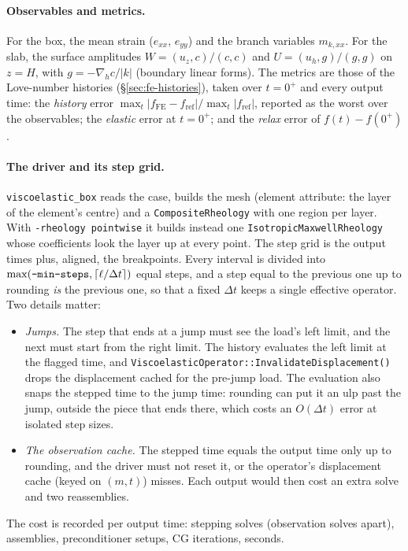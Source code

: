 \documentclass[11pt]{article}
\numberwithin{equation}{section}
\newcommand{\code}[1]{\texttt{#1}}
\begin{document}
\paragraph{Observables and metrics.}
For the box, the mean strain ($e_{xx}$, $e_{yy}$) and the branch variables
$m_{k,xx}$. For the slab, the surface amplitudes
$W=(u_z,c)/(c,c)$ and $U=(u_h,g)/(g,g)$ on $z=H$, with $g=-\nabla_hc/|k|$
(boundary linear forms). The metrics are those of the Love-number
histories (\S\ref{sec:fe-histories}), taken over $t=0^+$ and every output
time: the \emph{history} error
$\max_t|f_{\text{FE}}-f_{\text{ref}}|/\max_t|f_{\text{ref}}|$, reported as
the worst over the observables; the \emph{elastic} error at $t=0^+$; and
the \emph{relax} error of $f(t)-f(0^+)$.

\paragraph{The driver and its step grid.}
\code{viscoelastic\_box} reads the case, builds the mesh (element
attribute: the layer of the element's centre) and a
\code{CompositeRheology} with one region per layer. With
\code{-rheology pointwise} it builds instead one
\code{IsotropicMaxwellRheology} whose coefficients look the layer up at
every point. The step grid is the output times plus, aligned, the
breakpoints. Every interval is divided into
$\max(\text{\code{-min-steps}},\lceil\ell/\Delta t\rceil)$ equal steps, and
a step equal to the previous one up to rounding \emph{is} the previous
one, so that a fixed $\Delta t$ keeps a single effective operator. Two
details matter:
\begin{itemize}[leftmargin=*]
\item \emph{Jumps.} The step that ends at a jump must see the load's left
  limit, and the next must start from the right limit. The history
  evaluates the left limit at the flagged time, and
  \code{ViscoelasticOperator::InvalidateDisplacement()} drops the
  displacement cached for the pre-jump load. The evaluation also snaps the
  stepped time to the jump time: rounding can put it an ulp past the jump,
  outside the piece that ends there, which costs an $O(\Delta t)$ error at
  isolated step sizes.
\item \emph{The observation cache.} The stepped time equals the output
  time only up to rounding, and the driver must not reset it, or the
  operator's displacement cache (keyed on $(m,t)$) misses. Each output
  would then cost an extra solve and two reassemblies.
\end{itemize}
The cost is recorded per output time: stepping solves (observation solves
apart), assemblies, preconditioner setups, CG iterations, seconds.
\end{document}
